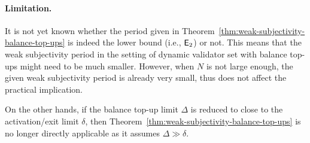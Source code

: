 \paragraph{Limitation.}

It is not yet known whether the period given in Theorem~\ref{thm:weak-subjectivity-balance-top-ups} is indeed the lower bound (i.e., $\mathsf{E}_2$) or not.
This means that the weak subjectivity period in the setting of dynamic validator set with balance top-ups might need to be much smaller.
However, when $N$ is not large enough, the given weak subjectivity period is already very small, thus does not affect the practical implication.

On the other hands, if the balance top-up limit $\Delta$ is reduced to close to the activation/exit limit $\delta$, then Theorem~\ref{thm:weak-subjectivity-balance-top-ups} is no longer directly applicable as it assumes $\Delta \gg \delta$.
